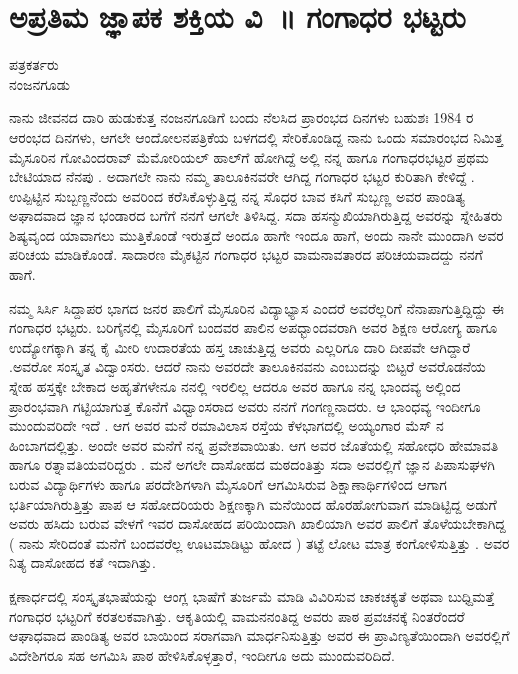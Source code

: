 {\fontsize{14}{16}\selectfont
\chapter{ಅಪ್ರತಿಮ ಜ್ಞಾಪಕ ಶಕ್ತಿಯ ವಿ~॥ ಗಂಗಾಧರ ಭಟ್ಟರು}

\begin{center}

ಪತ್ರಕರ್ತರು\\  
ನಂಜನಗೂಡು
\addrule
\end{center}

ನಾನು ಜೀವನದ ದಾರಿ ಹುಡುಕುತ್ತ ನಂಜನಗೂಡಿಗೆ ಬಂದು ನೆಲಸಿದ ಪ್ರಾರಂಭದ ದಿನಗಳು ಬಹುಶಃ 1984 ರ ಆರಂಭದ ದಿನಗಳು,  ಆಗಲೇ  ಆಂದೋಲನಪತ್ರಿಕೆಯ ಬಳಗದಲ್ಲಿ ಸೇರಿಕೊಂಡಿದ್ದ ನಾನು ಒಂದು ಸಮಾರಂಭದ ನಿಮಿತ್ತ ಮೈಸೂರಿನ  ಗೋವಿಂದರಾವ್ ಮೆಮೋರಿಯಲ್ ಹಾಲ್‍ಗೆ   ಹೋಗಿದ್ದೆ ಅಲ್ಲಿ ನನ್ನ ಹಾಗೂ ಗಂಗಾಧರಭಟ್ಟರ ಪ್ರಥಮ ಬೇಟಿಯಾದ ನೆನಪು . ಅದಾಗಲೇ ನಾನು ನಮ್ಮ ತಾಲೂಕಿನವರೇ ಆಗಿದ್ದ  ಗಂಗಾಧರ ಭಟ್ಟರ ಕುರಿತಾಗಿ ಕೇಳಿದ್ದೆ .   ಉಪ್ಪಿಟ್ಟಿನ ಸುಬ್ಬಣ್ಣನೆಂದು ಅವರಿಂದ ಕರೆಸಿಕೊಳ್ಳುತ್ತಿದ್ದ ನನ್ನ ಸೊಧರ ಬಾವ ಕಸಿಗೆ ಸುಬ್ಬಣ್ಣ  ಅವರ ಪಾಂಡಿತ್ಯ  ಅಘಾದವಾದ ಜ್ಞಾನ ಭಂಡಾರದ ಬಗೆಗೆ ನನಗೆ ಆಗಲೇ ತಿಳಿಸಿದ್ದ. ಸದಾ  ಹಸನ್ಮುಖಿಯಾಗಿರುತ್ತಿದ್ದ  ಅವರನ್ನು ಸ್ನೇಹಿತರು ಶಿಷ್ಯವೃಂದ ಯಾವಾಗಲು ಮುತ್ತಿಕೊಂಡೆ ಇರುತ್ತದೆ ಅಂದೂ ಹಾಗೇ  ಇಂದೂ ಹಾಗೆ, ಅಂದು ನಾನೇ ಮುಂದಾಗಿ ಅವರ  ಪರಿಚಯ ಮಾಡಿಕೊಂಡೆ.  ಸಾದಾರಣ ಮೈಕಟ್ಟಿನ  ಗಂಗಾಧರ ಭಟ್ಟರ ವಾಮನಾವತಾರದ ಪರಿಚಯವಾದದ್ದು ನನಗೆ ಹಾಗೆ.

ನಮ್ಮ  ಸಿರ್ಸಿ ಸಿದ್ದಾಪರ  ಭಾಗದ ಜನರ ಪಾಲಿಗೆ ಮೈಸೂರಿನ ವಿದ್ಯಾಭ್ಯಾಸ  ಎಂದರೆ ಅವರೆಲ್ಲರಿಗೆ ನೆನಾಪಾಗುತ್ತಿದ್ದಿದ್ದು  ಈ ಗಂಗಾಧರ ಭಟ್ಟರು. ಬರಿಗೈನಲ್ಲಿ ಮೈಸೂರಿಗೆ ಬಂದವರ ಪಾಲಿನ ಅಪಧ್ಭಾಂದವರಾಗಿ  ಅವರ ಶಿಕ್ಷಣ ಆರೋಗ್ಯ ಹಾಗೂ ಉದ್ಯೋಗಕ್ಕಾಗಿ   ತನ್ನ ಕೈ ಮೀರಿ  ಉದಾರತೆಯ ಹಸ್ತ ಚಾಚುತ್ತಿದ್ದ  ಅವರು ಎಲ್ಲರಿಗೂ ದಾರಿ ದೀಪವೇ  ಆಗಿದ್ದಾರೆ .ಅವರೋ ಸಂಸ್ಕೃತ ವಿದ್ವಾಂಸರು. ಆದರೆ ನಾನು  ಅವರದೇ ತಾಲೂಕಿನವನು ಎಂಬುದನ್ನು ಬಿಟ್ಟರೆ  ಅವರೊಡನೆಯ  ಸ್ನೇಹ ಹಸ್ತಕ್ಕೇ ಬೇಕಾದ ಅಹೃತೆಗಳೇನೂ ನನಲ್ಲಿ ಇರಲಿಲ್ಲ   ಆದರೂ  ಅವರ ಹಾಗೂ ನನ್ನ ಭಾಂದವ್ಯ     ಅಲ್ಲಿಂದ ಪ್ರಾರಂಭವಾಗಿ ಗಟ್ಟಿಯಾಗುತ್ತ ಕೊನೆಗೆ ವಿಧ್ವಾಂಸರಾದ ಅವರು  ನನಗೆ ಗಂಗಣ್ಣನಾದರು. ಆ ಭಾಂಧವ್ಯ ಇಂದೀಗೂ ಮುಂದುವರಿದೇ ಇದೆ .  ಆಗ ಅವರ ಮನೆ  ರಮಾವಿಲಾಸ ರಸ್ತೆಯ ಕೆಳಭಾಗದಲ್ಲಿ ಅಯ್ಯಂಗಾರ ಮೆಸ್ ನ ಹಿಂಬಾಗದಲ್ಲಿತ್ತು.   ಅಂದೇ ಅವರ ಮನೆಗೆ ನನ್ನ ಪ್ರವೇಶವಾಯಿತು.  ಆಗ ಅವರ ಜೊತೆಯಲ್ಲಿ ಸಹೋಧರಿ ಹೇಮಾವತಿ ಹಾಗೂ ರತ್ನಾವತಿಯವರಿದ್ದರು  . ಮನೆ ಅಗಲೇ  ದಾಸೋಹದ ಮಠದಂತಿತ್ತು  ಸದಾ ಅವರಲ್ಲಿಗೆ ಜ್ಞಾನ ಪಿಪಾಸುಘಳಗಿ ಬರುವ ವಿದ್ಯಾರ್ಥಿಗಳು ಹಾಗೂ ಪರದೇಶಿಗಳಾಗಿ ಮೈಸೂರಿಗೆ ಆಗಮಿಸಿರುವ ಶಿಕ್ಷಾಣಾರ್ಥಿಗಳಿಂದ   ಆಗಾಗ ಭರ್ತಿಯಾಗಿರುತ್ತಿತ್ತು ಪಾಪ ಆ ಸಹೋದರಿಯರು ಶಿಕ್ಷಣಕ್ಕಾಗಿ ಮನೆಯಿಂದ ಹೊರಹೋಗುವಾಗ   ಮಾಡಿಟ್ಟಿದ್ದ ಅಡುಗೆ ಅವರು ಹಸಿದು ಬರುವ ವೇಳಗೆ ಇವರ ದಾಸೋಹದ ಪರಿಯಿಂದಾಗಿ  ಖಾಲಿಯಾಗಿ ಅವರ ಪಾಲಿಗೆ ತೊಳೆಯಬೇಕಾಗಿದ್ದ ( ನಾನು  ಸೇರಿದಂತೆ ಮನೆಗೆ ಬಂದವರೆಲ್ಲ ಊಟಮಾಡಿಟ್ಟು ಹೋದ )   ತಟ್ಟೆ ಲೋಟ ಮಾತ್ರ ಕಂಗೋಳಿಸುತ್ತಿತ್ತು . ಅವರ ನಿತ್ಯ ದಾಸೋಹದ ಕತೆ ಇದಾಗಿತ್ತು. 

ಕ್ಷಣಾರ್ಧದಲ್ಲಿ  ಸಂಸ್ಕೃತಭಾಷೆಯನ್ನು ಆಂಗ್ಲ ಭಾಷೆಗೆ ತುರ್ಜಮೆ ಮಾಡಿ  ವಿವಿರಿಸುವ ಚಾಕಚಕ್ಯತೆ ಅಥವಾ ಬುಧ್ದಿಮತ್ತೆ ಗಂಗಾಧರ ಭಟ್ಟರಿಗೆ ಕರತಲಕವಾಗಿತ್ತು.  ಆಕೃತಿಯಲ್ಲಿ ವಾಮನನಂತಿದ್ದ ಅವರು ಪಾಠ ಪ್ರವಚನಕ್ಕೆ ನಿಂತರೆಂದರೆ ಆಘಾಧವಾದ ಪಾಂಡಿತ್ಯ ಅವರ ಬಾಯಿಂದ ಸರಾಗವಾಗಿ ಮಾರ್ಧನಿಸುತ್ತಿತ್ತು ಅವರ ಈ ಪ್ರಾವಿಣ್ಯತೆಯಿಂದಾಗಿ  ಅವರಲ್ಲಿಗೆ ವಿದೇಶಿಗರೂ ಸಹ  ಅಗಮಿಸಿ ಪಾಠ ಹೇಳಿಸಿಕೊಳ್ಳತ್ತಾರೆ, ಇಂದೀಗೂ ಅದು ಮುಂದುವರಿದಿದೆ.

}
